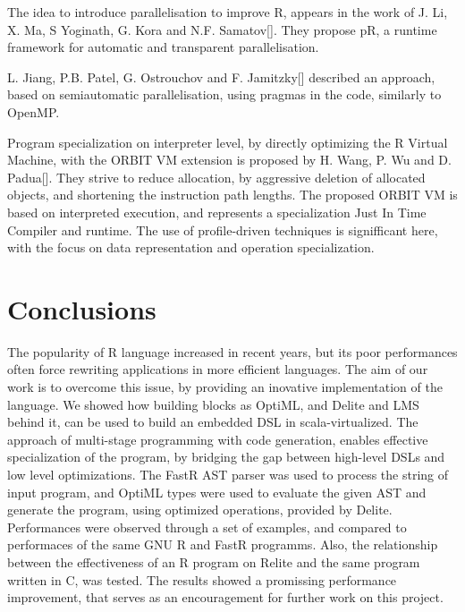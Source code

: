 \documentclass{sigplanconf}
\begin{document}
The idea to introduce parallelisation to improve R, appears in the work of J. Li, X. Ma, S Yoginath, G. Kora and N.F. Samatov[]. They propose pR, a runtime framework for automatic and transparent 
parallelisation.

L. Jiang, P.B. Patel, G. Ostrouchov and F. Jamitzky[] described an approach, based on semiautomatic parallelisation, using pragmas in the code, similarly to OpenMP.

Program specialization on interpreter level, by directly optimizing the R Virtual Machine, with the ORBIT VM extension is proposed by H. Wang, P. Wu and D. Padua[]. They strive to reduce allocation,
by aggressive deletion of allocated objects, and shortening the instruction path lengths. The proposed ORBIT VM is based on interpreted execution, and represents a specialization Just In Time Compiler
and runtime. The use of profile-driven techniques is signifficant here, with the focus on data representation and operation specialization.

\section{Conclusions}
The popularity of R language increased in recent years, but its poor performances often force rewriting applications in more efficient languages. The aim of our work is to overcome this issue, 
by providing an inovative implementation of the language. We showed how building blocks as OptiML, and Delite and LMS behind it, can be used to build an embedded DSL in scala-virtualized. 
The approach of multi-stage programming with code generation, enables effective specialization of the program, by bridging the gap between high-level DSLs and low level optimizations. The FastR AST 
parser was used to process the string of input program, and OptiML types were used to evaluate the given AST and generate the program, using optimized operations, provided by Delite. Performances were 
observed through a set of examples, and compared to performaces of the same GNU R and FastR programms. Also, the relationship between the effectiveness of an R program on Relite and the same program 
written in C, was tested. The results showed a promissing performance improvement, that serves as an encouragement for further work on this project.

\end{document}
